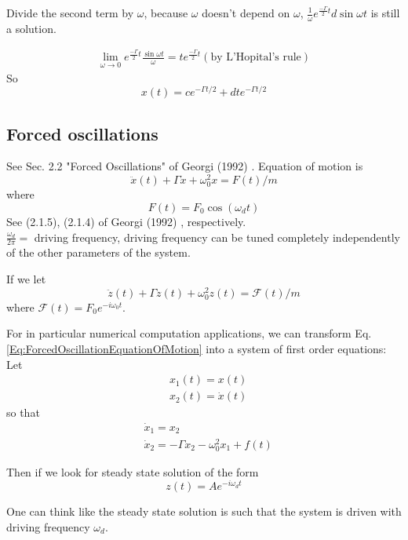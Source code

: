 \documentclass[10pt]{amsart}
\begin{document}
\begin{multicols*}{2}
Divide the second term by $\omega$, because $\omega$ doesn't depend on $\omega$, $\frac{1}{\omega} e^{\frac{-\Gamma}{2} t} d\sin{\omega t}$ is still a solution.

\[
\begin{gathered}
	\lim_{\omega \to 0} e^{ \frac{-\Gamma}{2} t} \frac{ \sin{ \omega t} }{\omega} = te^{\frac{-\Gamma}{2} t} (\text{by L'Hopital's rule})
\end{gathered}
\]
So
\[
x(t) = ce^{ - \Gamma t/2} + dte^{-\Gamma t/2}
\]

\subsection{Forced oscillations} See Sec. 2.2 "Forced Oscillations" of Georgi (1992) \cite{Geor1992}.
Equation of motion is
\begin{equation}\label{Eq:ForcedOscillationEquationOfMotion}
	\ddot{x}(t) + \Gamma \dot{x} + \omega_0^2 x = F(t) /m 
\end{equation}
where
\begin{equation}
	F(t) = F_0 \cos{(\omega_dt)}
\end{equation}
See (2.1.5), (2.1.4) of Georgi (1992) \cite{Geor1992}, respectively. \\

$\frac{\omega_d}{2\pi} = $ driving frequency, driving frequency can be tuned completely independently of the other parameters of the system.

If we let 
\[
\ddot{z}(t) + \Gamma \dot{z}(t) + \omega_0^2 z(t) = \mathcal{F}(t) /m
\]
where $\mathcal{F}(t) = F_0 e^{-i \omega_0 t}$.

For in particular numerical computation applications, we can transform Eq. \ref{Eq:ForcedOscillationEquationOfMotion} into a system of first order equations: \\
Let 
\[
\begin{aligned}
	& x_1(t) = x(t) \\
	& x_2(t) = \dot{x}(t)
\end{aligned}
\]
so that
\[
\begin{aligned}
	& \dot{x}_1 = x_2 \\
	& \dot{x}_2 = -\Gamma x_2 - \omega_0^2 x_1 + f(t)
\end{aligned}
\]

Then if we look for steady state solution of the form
\[
z(t) = A e^{-i \omega_d t}
\]

One can think like the steady state solution is such that the system is driven with driving frequency $\omega_d$.


\end{multicols*}
\end{document}
